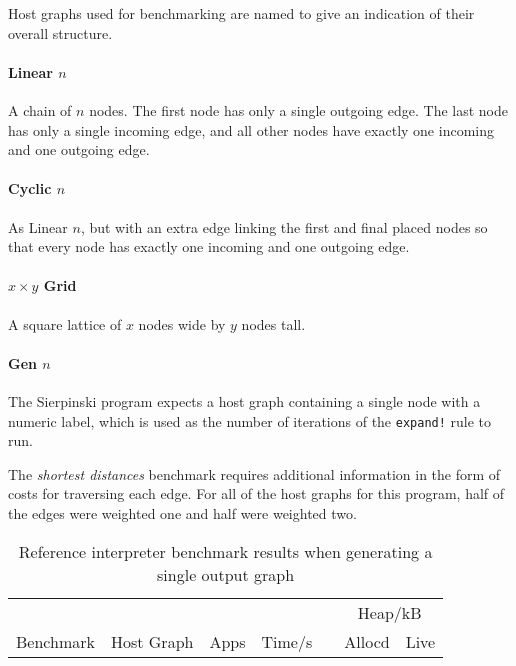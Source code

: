 Host graphs used for benchmarking are named to give an indication of their overall structure.


\paragraph*{Linear $n$}

A chain of $n$ nodes. The first node has only a single outgoing edge. The last node has only a single incoming edge, and all other nodes have exactly one incoming and one outgoing edge.

\paragraph*{Cyclic $n$}

As Linear $n$, but with an extra edge linking the first and final placed nodes so that every node has exactly one incoming and one outgoing edge.

\paragraph*{$x \times y$ Grid}

A square lattice of $x$ nodes wide by $y$ nodes tall.

\paragraph*{Gen $n$}

The Sierpinski program expects a host graph containing a single node with a numeric label, which is used as the number of iterations of the \texttt{expand!} rule to run.


The \textit{shortest distances} benchmark requires additional information in the form of costs for traversing each edge. For all of the host graphs for this program, half of the edges were weighted one and half were weighted two.




\begin{table}[h]
\begin{minipage}{\textwidth}
\centering

\begin{tabular}{llrrcrr}
\hline 
&  & & & & \multicolumn{2}{c}{Heap/kB}\\
Benchmark          & Host Graph\footnotemark & Apps & Time/s   & & Allocd & Live \\
\hline 

\end{tabular}

\caption[Reference interpreter benchmarks]{Reference interpreter benchmark results when generating a single output graph}

\label{table:resultsSingle}
\end{minipage}
\end{table}



